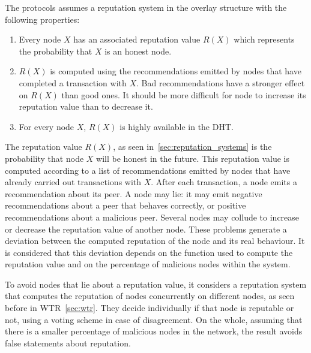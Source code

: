 




The protocols assumes a reputation system in the overlay structure with the following properties:
\begin{enumerate}
  \item Every node $X$ has an associated reputation value $R(X)$
  which represents the probability that $X$ is an honest node.
  \item $R(X)$ is computed using the recommendations emitted
  by nodes that have completed a transaction with $X$. Bad
  recommendations have a stronger effect on $R(X)$ than
  good ones. It should be more difficult for node to
  increase its reputation value than to decrease it.
  \item For every node $X$, $R(X)$ is highly available in the DHT.
\end{enumerate}

The reputation value $R(X)$, as seen in~\ref{sec:reputation_systems} is the probability that node $X$ will
be honest in the future. This reputation value is computed
according to a list of recommendations emitted by nodes that
have already carried out transactions with $X$.
After each transaction, a node emits a recommendation
about its peer. A node may lie: it may emit negative
recommendations about a peer that behaves correctly, or
positive recommendations about a malicious peer. Several nodes
may collude to increase or decrease the reputation value of
another node. These problems generate a deviation between
the computed reputation of the node and its real behaviour. It is
considered that this deviation depends on the function used to
compute the reputation value and on the percentage of malicious
nodes within the system.

To avoid nodes that lie about a reputation value, it considers a reputation
system that computes the reputation of nodes concurrently on different nodes,
as seen before in WTR~\ref{sec:wtr}.
They decide individually if that node is reputable or not, using a voting
scheme in case of disagreement. On the whole, assuming that there is a smaller
percentage of malicious nodes in the network, the result avoids
false statements about reputation.

